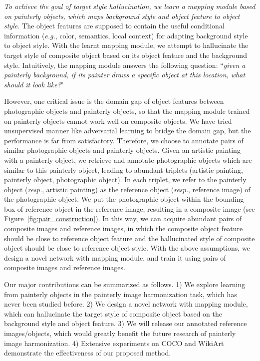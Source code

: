 \documentclass[letterpaper]{article} %
\begin{document}
\emph{To achieve the goal of target style hallucination, we learn a mapping module based on painterly objects, which maps background style and object feature to object style.} The object features are supposed to contain the useful conditional information (\emph{e.g.}, color, semantics, local context) for adapting background style to object style. With the learnt mapping module, we attempt to hallucinate the target style of composite object based on its object feature and the background style. Intuitively, the mapping module answers the following question: ``\emph{given a painterly background, if its painter draws a specific object at this location, what should it look like?}"

However, one critical issue is the domain gap of object features between photographic objects and painterly objects, so that the mapping module trained on painterly objects cannot work well on composite objects. We have tried unsupervised manner like adversarial learning \cite{goodfellow2020generative} to bridge the domain gap, but the performance is far from satisfactory. Therefore, we choose to annotate pairs of similar photographic objects and painterly objects. Given an artistic painting with a painterly object, we retrieve and annotate photographic objects which are similar to this painterly object, leading to abundant triplets (artistic painting, painterly object, photographic object). In each triplet, we refer to the painterly object (\emph{resp.}, artistic painting) as the reference object (\emph{resp.}, reference image) of the photographic object. We put the photographic object within the bounding box of reference object in the reference image, resulting in a composite image (see Figure~\ref{fig:pair_construction}).
In this way, we can acquire abundant pairs of composite images and reference images, in which the composite object feature should be close to reference object feature and the hallucinated style of composite object should be close to reference object style. With the above assumptions, we design a novel network with mapping module, and train it using pairs of composite images and reference images.

Our major contributions can be summarized as follows. 1) We explore learning from painterly objects in the painterly image harmonization task, which has never been studied before. 2) We design a novel network with mapping module, which can hallucinate the target style of composite object based on the background style and object feature. 3) We will release our annotated reference images/objects, which would greatly benefit the future research of painterly image harmonization.
4) Extensive experiments on COCO \cite{lin2014microsoft} and WikiArt \cite{nichol2016painter} demonstrate the effectiveness of our proposed method.
\end{document}
